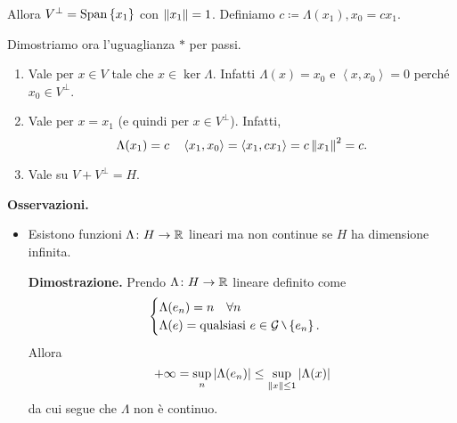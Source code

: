 Allora $V^\perp = \operatorname{Span} \left\{ x_1 \right\}$ con $\left\lVert x_1 \right\rVert = 1$. Definiamo $c \coloneqq \Lambda(x_1), x_0 = c x_1$.

Dimostriamo ora l'uguaglianza $\ast$ per passi.

\begin{enumerate}
\item Vale per $x \in V$ tale che $x \in \ker \Lambda$. Infatti $\Lambda(x)=x_0$ e $\left<x,x_0 \right> = 0$ perché $x_0 \in V^\perp$.

\item Vale per $x = x_1$ (e quindi per $x \in V^\perp$). Infatti, 
%
$$
\Lambda(x_1) = c \quad \left<x_1,x_0 \right> = \left<x_1, c x_1 \right> = c \left\lVert x_1 \right\rVert^2 = c.
$$
%

\item Vale su $V + V^\perp = H$.
\end{enumerate}

\textbf{Osservazioni.}
\begin{itemize}
\item Esistono funzioni $\Lambda \colon  H \to \mathbb R$ lineari ma non continue se $H$ ha dimensione infinita.

\textbf{Dimostrazione.} Prendo $\Lambda \colon H \to \mathbb R$ lineare definito come
%
$$
\begin{cases}
\Lambda(e_n) = n \quad \forall n \\
\Lambda(e) = \text{qualsiasi } e \in \mc{G} \setminus \left\{ e_n \right\}.
\end{cases} 
$$
%
Allora
%
$$
+\infty = \sup_n \left| \Lambda(e_n) \right| \leq \sup_{\left\lVert x \right\rVert \leq 1} \left| \Lambda(x) \right| 
$$
%
da cui segue che $\Lambda$ non è continuo.

\end{itemize}

